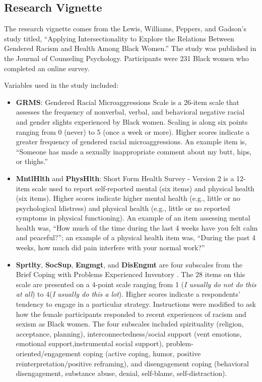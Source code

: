\documentclass[
]{book}
\begin{document}
\hypertarget{research-vignette-5}{%
\subsection{Research Vignette}\label{research-vignette-5}}

The research vignette comes from the Lewis, Williams, Peppers, and Gadson's \citeyearpar{lewis_applying_2017} study titled, ``Applying Intersectionality to Explore the Relations Between Gendered Racism and Health Among Black Women.'' The study was published in the Journal of Counseling Psychology. Participants were 231 Black women who completed an online survey.

Variables used in the study included:

\begin{itemize}
\item
  \textbf{GRMS}: Gendered Racial Microaggressions Scale \citep{lewis_construction_2015} is a 26-item scale that assesses the frequency of nonverbal, verbal, and behavioral negative racial and gender slights experienced by Black women. Scaling is along six points ranging from 0 (never) to 5 (once a week or more). Higher scores indicate a greater frequency of gendered racial microaggressions. An example item is, ``Someone has made a sexually inappropriate comment about my butt, hips, or thighs.''
\item
  \textbf{MntlHlth} and \textbf{PhysHlth}: Short Form Health Survey - Version 2 \citep{ware_comparison_1995} is a 12-item scale used to report self-reported mental (six items) and physical health (six items).
  Higher scores indicate higher mental health (e.g., little or no psychological ldistress) and physical health (e.g., little or no reported symptoms in physical functioning). An example of an item assessing mental health was, ``How much of the time during the last 4 weeks have you felt calm and peaceful?''; an example of a physical health item was, ``During the past 4 weeks, how much did pain interfere with your normal work?''
\item
  \textbf{Sprtlty}, \textbf{SocSup}, \textbf{Engmgt}, and \textbf{DisEngmt} are four subscales from the Brief Coping with Problems Experienced Inventory \citep{carver_you_1997}. The 28 items on this scale are presented on a 4-point scale ranging from 1 (\emph{I usually do not do this at all}) to 4(\emph{I usually do this a lot}). Higher scores indicate a respondents' tendency to engage in a particular strategy. Instructions were modified to ask how the female participants responded to recent experiences of racism and sexism as Black women. The four subscales included spirituality (religion, acceptance, planning), interconnectedness/social support (vent emotions, emotional support,instrumental social support), problem-oriented/engagement coping (active coping, humor, positive reinterpretation/positive reframing), and disengagement coping (behavioral disengagement, substance abuse, denial, self-blame, self-distraction).

\end{itemize}
\end{document}
